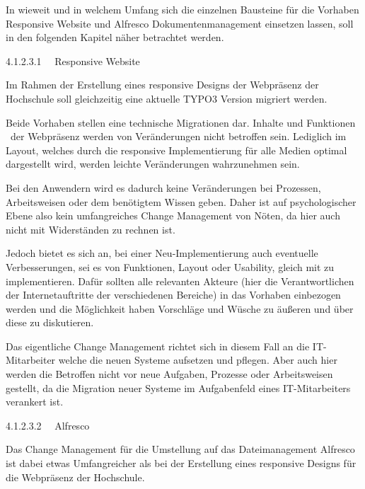 \documentclass{article}
\begin{document}
\bigskip

In wieweit und in welchem Umfang sich die einzelnen Bausteine für die Vorhaben Responsive Website und Alfresco
Dokumentenmanagement einsetzen lassen, soll in den folgenden Kapitel näher betrachtet werden.


\bigskip

4.1.2.3.1 \ \ Responsive Website

Im Rahmen der Erstellung eines responsive Designs der Webpräsenz der Hochschule soll gleichzeitig eine aktuelle TYPO3
Version migriert werden. 


\bigskip

Beide Vorhaben stellen eine technische Migrationen dar. Inhalte und Funktionen \ der Webpräsenz werden von Veränderungen
nicht betroffen sein. Lediglich im Layout, welches durch die responsive Implementierung für alle Medien optimal
dargestellt wird, werden leichte Veränderungen wahrzunehmen sein. 


\bigskip

Bei den Anwendern wird es dadurch keine Veränderungen bei Prozessen, Arbeitsweisen oder dem benötigtem Wissen geben.
Daher ist auf psychologischer Ebene also kein umfangreiches Change Management von Nöten, da hier auch nicht mit
Widerständen zu rechnen ist. 


\bigskip

Jedoch bietet es sich an, bei einer Neu-Implementierung auch eventuelle Verbesserungen, sei es von Funktionen, Layout
oder Usability, gleich mit zu implementieren. Dafür sollten alle relevanten Akteure (hier die Verantwortlichen der
Internetauftritte der verschiedenen Bereiche) in das Vorhaben einbezogen werden und die Möglichkeit haben Vorschläge
und Wüsche zu äußeren und über diese zu diskutieren. 


\bigskip

Das eigentliche Change Management richtet sich in diesem Fall an die IT-Mitarbeiter welche die neuen Systeme aufsetzen
und pflegen. Aber auch hier werden die Betroffen nicht vor neue Aufgaben, Prozesse oder Arbeitsweisen gestellt, da die
Migration neuer Systeme im Aufgabenfeld eines IT-Mitarbeiters verankert ist. 


\bigskip

4.1.2.3.2 \ \ Alfresco

Das Change Management für die Umstellung auf das Dateimanagement Alfresco ist dabei etwas Umfangreicher als bei der
Erstellung eines responsive Designs für die Webpräsenz der Hochschule. 


\bigskip
\end{document}
